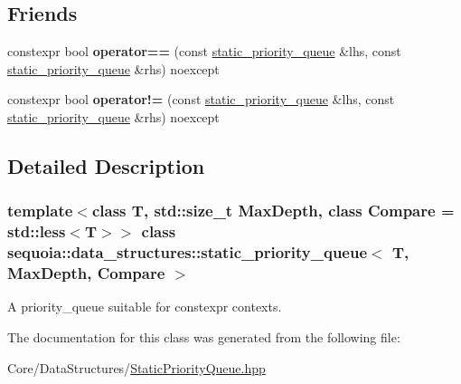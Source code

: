 \subsection*{Friends}
\begin{DoxyCompactItemize}
\item 
\mbox{\label{classsequoia_1_1data__structures_1_1static__priority__queue_a1d7b6539870f395e828b1a00caf70d1c}} 
constexpr bool {\bfseries operator==} (const \mbox{\hyperlink{classsequoia_1_1data__structures_1_1static__priority__queue}{static\+\_\+priority\+\_\+queue}} \&lhs, const \mbox{\hyperlink{classsequoia_1_1data__structures_1_1static__priority__queue}{static\+\_\+priority\+\_\+queue}} \&rhs) noexcept
\item 
\mbox{\label{classsequoia_1_1data__structures_1_1static__priority__queue_a1316312a1998d8d70786454b0d96f13a}} 
constexpr bool {\bfseries operator!=} (const \mbox{\hyperlink{classsequoia_1_1data__structures_1_1static__priority__queue}{static\+\_\+priority\+\_\+queue}} \&lhs, const \mbox{\hyperlink{classsequoia_1_1data__structures_1_1static__priority__queue}{static\+\_\+priority\+\_\+queue}} \&rhs) noexcept
\end{DoxyCompactItemize}


\subsection{Detailed Description}
\subsubsection*{template$<$class T, std\+::size\+\_\+t Max\+Depth, class Compare = std\+::less$<$\+T$>$$>$\newline
class sequoia\+::data\+\_\+structures\+::static\+\_\+priority\+\_\+queue$<$ T, Max\+Depth, Compare $>$}

A priority\+\_\+queue suitable for constexpr contexts. 

The documentation for this class was generated from the following file\+:\begin{DoxyCompactItemize}
\item 
Core/\+Data\+Structures/\mbox{\hyperlink{_static_priority_queue_8hpp}{Static\+Priority\+Queue.\+hpp}}\end{DoxyCompactItemize}
